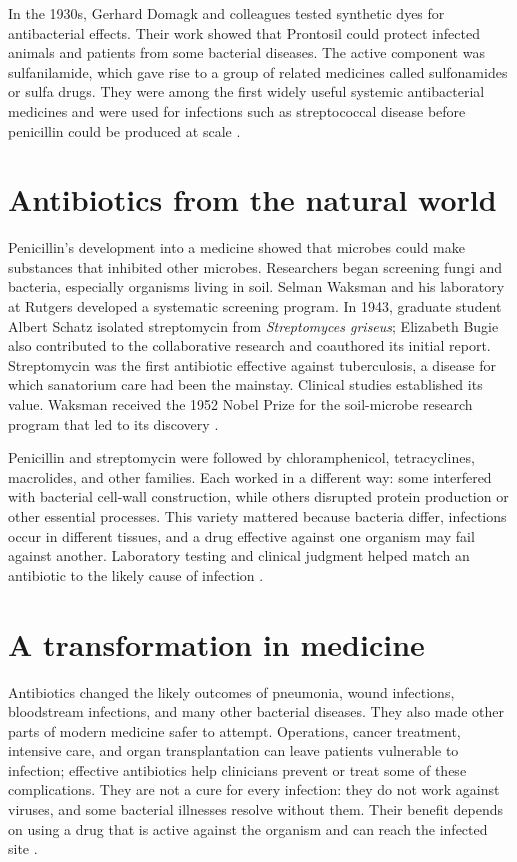 \documentclass[12pt,oneside]{book}
\begin{document}
In the 1930s, Gerhard Domagk and colleagues tested synthetic dyes for
antibacterial effects. Their work showed that Prontosil could protect
infected animals and patients from some bacterial diseases. The active
component was sulfanilamide, which gave rise to a group of related medicines
called sulfonamides or sulfa drugs. They were among the first widely useful
systemic antibacterial medicines and were used for infections such as
streptococcal disease before penicillin could be produced at scale
\cite{nobelDomagk,antibioticEraReview}.

\section{Antibiotics from the natural world}
Penicillin's development into a medicine showed that microbes could make
substances that inhibited other microbes. Researchers began screening fungi
and bacteria, especially organisms living in soil. Selman Waksman and his
laboratory at Rutgers developed a systematic screening program. In 1943,
graduate student Albert Schatz isolated streptomycin from
\emph{Streptomyces griseus}; Elizabeth Bugie also contributed to the
collaborative research and coauthored its initial report. Streptomycin was
the first antibiotic effective against tuberculosis, a disease for which
sanatorium care had been the mainstay. Clinical studies established its
value. Waksman received the 1952 Nobel Prize for the soil-microbe research
program that led to its discovery \cite{rutgersStreptomycin,nobelWaksman,antibioticEraReview}.

Penicillin and streptomycin were followed by chloramphenicol, tetracyclines,
macrolides, and other families. Each worked in a different way: some
interfered with bacterial cell-wall construction, while others disrupted
protein production or other essential processes. This variety mattered
because bacteria differ, infections occur in different tissues, and a drug
effective against one organism may fail against another. Laboratory testing
and clinical judgment helped match an antibiotic to the likely cause of
infection \cite{antibioticEraReview}.

\section{A transformation in medicine}
Antibiotics changed the likely outcomes of pneumonia, wound infections,
bloodstream infections, and many other bacterial diseases. They also made
other parts of modern medicine safer to attempt. Operations, cancer
treatment, intensive care, and organ transplantation can leave patients
vulnerable to infection; effective antibiotics help clinicians prevent or
treat some of these complications. They are not a cure for every infection:
they do not work against viruses, and some bacterial illnesses resolve
without them. Their benefit depends on using a drug that is active against
the organism and can reach the infected site \cite{cdcAntibioticUse,antibioticEraReview}.
\end{document}
